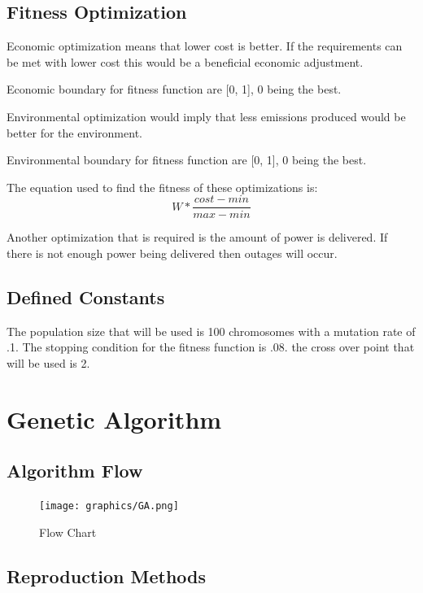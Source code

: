 \documentclass[conference]{IEEEtran}
\begin{document}
    \subsection{Fitness Optimization}
    Economic optimization means that lower cost is better.  If the requirements can be met with lower cost this would be a beneficial economic adjustment.

    Economic boundary for fitness function are [0, 1], 0 being the best.
    \newline 

    Environmental optimization would imply that less emissions produced would be better for the environment.

    Environmental boundary for fitness function are [0, 1], 0 being the best.
    \newline 

    The equation used to find the fitness of these optimizations is:
    \[W*\frac{cost-min}{max-min}\]

    Another optimization that is required is the amount of power is delivered.  If there is not enough power being delivered then outages will occur.

    \subsection{Defined Constants}
    The population size that will be used is 100 chromosomes with a mutation rate of .1.  The stopping condition for the fitness function is .08.  the cross over point that will be used is 2.

    \section{Genetic Algorithm}
    \subsection{Algorithm Flow}
        \begin{figure}[h!]
            \begin{center}
                \texttt{[image: graphics/GA.png]}
            \end{center}
            \caption{Flow Chart}
            \label{fig:gaflow}
        \end{figure}

    \subsection{Reproduction Methods}
\end{document}
